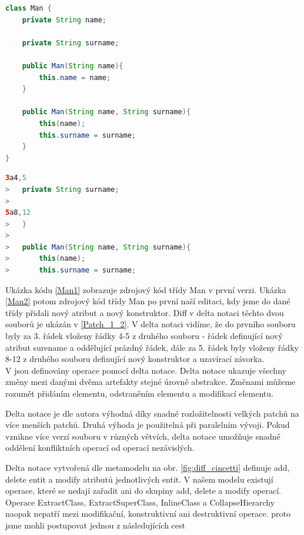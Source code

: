 \documentclass[11pt,twoside,a4paper]{book}
\begin{document}
\begin{lstlisting}[language=JAVA,frame=single,caption=Man2.java,label=Man2]
class Man {
	private String name;

	private String surname;

	public Man(String name){
		this.name = name;
	}

	public Man(String name, String surname){
		this(name);
		this.surname = surname;
	}
}
\end{lstlisting}

\begin{lstlisting}[language=JAVA,frame=single,caption=Patch Man1
Man2,label=Patch_1_2]
3a4,5
> 	private String surname;
> 
5a8,12
> 	}
> 
> 	public Man(String name, String surname){
> 		this(name);
> 		this.surname = surname;	
\end{lstlisting}

Ukázka kódu \ref{Man1} zobrazuje zdrojový kód třídy Man v první
verzi. Ukázka \ref{Man2} potom zdrojový kód třídy Man po první naší editaci,
kdy jsme do dané třídy přidali nový atribut a nový konstruktor.
Diff v delta notaci těchto dvou souborů je ukázán v \ref{Patch_1_2}. V delta
notaci vidíme, že do prvního souboru byly za 3. řádek vloženy řádky 4-5 z
druhého souboru - řádek definující nový atribut surename a oddělující prázdný
řádek, dále za 5. řádek byly vloženy řádky 8-12 z druhého souboru definující
nový konstruktor a uzavírací závorka.\\

V \cite{Cincetti} jsou definovány operace pomocí delta notace. Delta notace
ukazuje všechny změny mezi danými dvěma artefakty stejné úrovně abstrakce.
Změnami můžeme rozumět přidáním elementu, odstraněním elementu a modifikací elementu.

Delta notace je dle autora výhodná díky snadné rozložitelnosti velkých patchů na
více menších patchů. Druhá výhoda je použitelná při paralelním vývoji. Pokud
vznikne více verzí souboru v různých větvích, delta notace umožňuje snadné
oddělení konfliktních operací od operací nezávislých.

Delta notace vytvořená dle metamodelu na obr. \ref{fig:diff_cincetti} definuje
add, delete entit a modify atributů jednotlivých entit. V našem modelu existují
operace, které se nedají zařadit ani do skupiny add, delete a modify operací.
Operace ExtractClass, ExtractSuperClass, InlineClass a CollapseHierarchy naopak
nepatří mezi modifikační, konstruktivní ani destruktivní operace.
proto jsme mohli postupovat jednou z následujících cest
\end{document}
